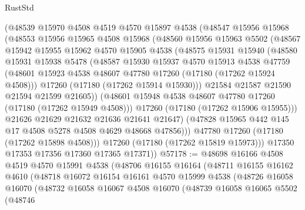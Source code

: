 \begin{lexlean}{RustStd}
\begin{coremodule}
          (@48539
            @15970
            @4508
            @4519
            @4570
            @15897
            @4538
            (@48547
              @15956
              @15968
              (@48553
                @15956
                @15965
                @4508
                @15968
                (@48560
                  @15956
                  @15963
                  @5502
                  (@48567
                    @15942
                    @15955
                    @15962
                    @4570
                    @15905
                    @4538
                    (@48575
                      @15931
                      @15940
                      (@48580
                        @15931
                        @15938
                        @5478
                        (@48587
                          @15930
                          @15937
                          @4570
                          @15913
                          @4538
                          @47759
                          (@48601 @15923 @4538 @48607 @47780 @17260 (@17180 (@17262 @15924 @4508)))
                          @17260
                          (@17180 (@17262 @15914 @15930)))
                        @21584
                        @21587
                        @21590
                        @21594
                        @21599
                        @21605))
                    (@48601 @15948 @4538 @48607 @47780 @17260 (@17180 (@17262 @15949 @4508)))
                    @17260
                    (@17180 (@17262 @15906 @15955)))
                  @21626
                  @21629
                  @21632
                  @21636
                  @21641
                  @21647)
                (@47828 @15965 @442 @145 @17 @4508 @5278 @4508 @4629 @48668 @47856)))
            @47780
            @17260
            (@17180 (@17262 @15898 @4508)))
          @17260
          (@17180 (@17262 @15819 @15973)))
        @17350
        @17353
        @17356
        @17360
        @17365
        @17371))
@57178 := @48698
    @16166
    @4508
    @4519
    @4570
    @15991
    @4538
    (@48706
      @16155
      @16164
      (@48711
        @16155
        @16162
        @4610
        (@48718
          @16072
          @16154
          @16161
          @4570
          @15999
          @4538
          (@48726
            @16058
            @16070
            (@48732
              @16058
              @16067
              @4508
              @16070
              (@48739
                @16058
                @16065
                @5502
                (@48746

\end{coremodule}
\end{lexlean}
